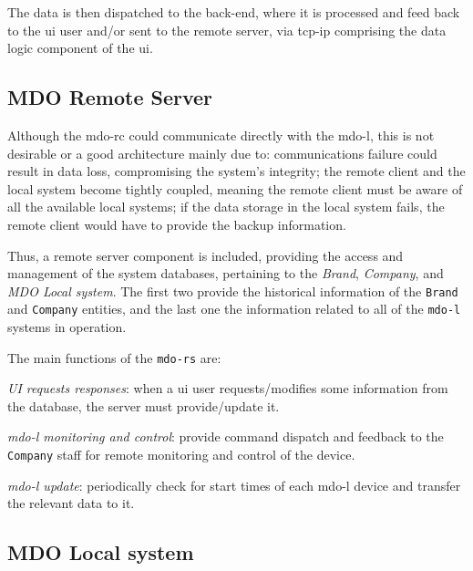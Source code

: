 The data is then dispatched to the back-end, where it is processed and feed back
to the \gls{ui} user and/or sent to the remote server, via \gls{tcp-ip}
comprising the data logic component of the \gls{ui}.
%
%
\subsection{MDO Remote Server}
\label{sec:mdo-remote-server}
Although the \gls{mdo-rc} could communicate directly with the \gls{mdo-l}, this
is not desirable or a good architecture mainly due to: communications failure could
result in data loss, compromising the system's integrity; the remote client and
the local system become tightly coupled, meaning the remote client must be aware
of all the available local systems; if the data storage in the local system
fails, the remote client would have to provide the backup information.

Thus, a remote server component is included, providing the access and management
of the system databases, pertaining to the \emph{Brand}, \emph{Company}, and
\emph{MDO Local system}. The first two provide the historical information of the
\texttt{Brand} and \texttt{Company} entities, and the last one the information
related to all of the \texttt{\gls{mdo-l}} systems in operation.

The main functions of the \texttt{\gls{mdo-rs}} are:
\begin{item-c}
\item \emph{UI requests responses}: when a \gls{ui} user requests/modifies
  some information from the database, the server must provide/update it.
\item \emph{\gls{mdo-l} monitoring and control}: provide command dispatch and
  feedback to the \texttt{Company} staff for remote monitoring and control of
  the device.
\item \emph{\gls{mdo-l} update}: periodically check for start times of each
  \gls{mdo-l} device and transfer the relevant data to it.
\end{item-c}
%

\subsection{MDO Local system}
\label{sec:mdo-local-system}




